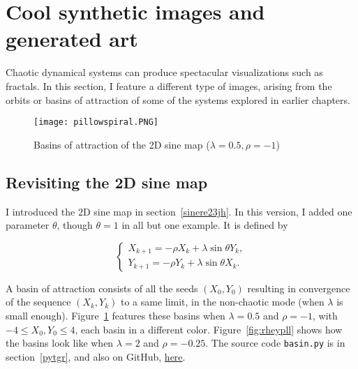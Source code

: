 \documentclass[oneside,10pt]{book}
\begin{document}


\section{Cool synthetic images and generated art}\label{2dsinemp}

Chaotic dynamical systems can produce spectacular visualizations such as fractals. In this section, I feature a different type of images, arising
 from the orbits or basins of attraction of some of the systems explored in earlier chapters.

\begin{figure}[H]
\centering
\texttt{[image: pillowspiral.PNG]} %
\caption{Basins of attraction of the 2D sine map ($\lambda=0.5,\rho=-1$)}
\label{gholdust}
\end{figure}

\subsection{Revisiting the 2D sine map}

I introduced the 2D sine map in section~\ref{sinere23jh}. In this version, I added one parameter $\theta$,
 though $\theta=1$ in all but one example. It is defined by 

\begin{equation}
    \begin{cases} 
      X_{k+1} = -\rho X_k + \lambda \sin \theta Y_k, \\[3pt]
     Y_{k+1} = -\rho Y_k + \lambda \sin \theta X_k. \label{gfda}
    \end{cases} %
\end{equation}

A \textcolor{index}{basin of attraction} consists of all the seeds $(X_0,Y_0)$ resulting in convergence
 of the sequence $(X_k,Y_k)$ to a same limit, in the non-chaotic mode (when $\lambda$ is small enough).  
 Figure~\ref{gholdust} features these basins when $\lambda=0.5$ and $\rho=-1$, with $-4\leq X_0,Y_0\leq 4$, each basin in a different color. Figure~\ref{fig:rheypll} shows how the basins look like when $\lambda=2$ and $\rho=-0.25$. 
The source code \texttt{basin.py} is in section~\ref{pytgr}, and also on GitHub, \href{https://github.com/VincentGranville/Stochastic-Processes/blob/master/basin.py}{here}.
\end{document}
